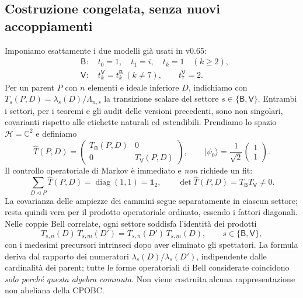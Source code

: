 \documentclass[11pt,a4paper]{article}
\begin{document}
\subsection*{Costruzione congelata, senza nuovi accoppiamenti}
Imponiamo esattamente i due modelli gi\`a usati in v0.65:
\begin{equation}
\begin{aligned}
&\mathsf B:\quad t_0=1,\quad t_1=i,\quad t_k=1\quad(k\ge2),\\
&\mathsf V:\quad t_k^{\mathsf V}=t_k^{\mathsf B}\ (k\ne7),\qquad t_7^{\mathsf V}=2.
\end{aligned}\tag{DS.1}
\end{equation}
Per un parent $P$ con $n$ elementi e ideale inferiore $D$, indichiamo con $T_s(P,D)=\lambda_s(D)/\Lambda_{n,s}$ la transizione scalare del settore $s\in\{\mathsf B,\mathsf V\}$. Entrambi i settori, per i teoremi e gli audit delle versioni precedenti, sono non singolari, covarianti rispetto alle etichette naturali ed estendibili. Prendiamo lo spazio $\mathcal H=\mathbb C^2$ e definiamo
\begin{equation}
\boxed{\widehat T(P,D)=\begin{pmatrix}T_{\mathsf B}(P,D)&0\\0&T_{\mathsf V}(P,D)\end{pmatrix},\qquad |\psi_0\rangle=\frac1{\sqrt2}\begin{pmatrix}1\\1\end{pmatrix}.}\tag{DS.2}
\end{equation}
Il controllo operatoriale di Markov \`e immediato e \emph{non} richiede un fit:
\begin{equation}
\sum_{D\triangleleft P}\widehat T(P,D)=\operatorname{diag}(1,1)=\mathbf1_2,
\qquad \det\widehat T(P,D)=T_{\mathsf B}T_{\mathsf V}\ne0.\tag{DS.3}
\end{equation}
La covarianza delle ampiezze dei cammini segue separatamente in ciascun settore; resta quindi vera per il prodotto operatoriale ordinato, essendo i fattori diagonali. Nelle coppie Bell correlate, ogni settore soddisfa l'identit\`a dei prodotti
\begin{equation}
T_{s,n}(D)\,T_{s,m}(D')=T_{s,n}(D')\,T_{s,m}(D),\qquad s\in\{\mathsf B,\mathsf V\},\tag{DS.4}
\end{equation}
con i medesimi precursori intrinseci dopo aver eliminato gli spettatori. La formula deriva dal rapporto dei numeratori $\lambda_s(D)/\lambda_s(D')$, indipendente dalle cardinalit\`a dei parent; tutte le forme operatoriali di Bell considerate coincidono \emph{solo perch\'e questa algebra commuta}. Non viene costruita alcuna rappresentazione non abeliana della CPOBC.
\end{document}
